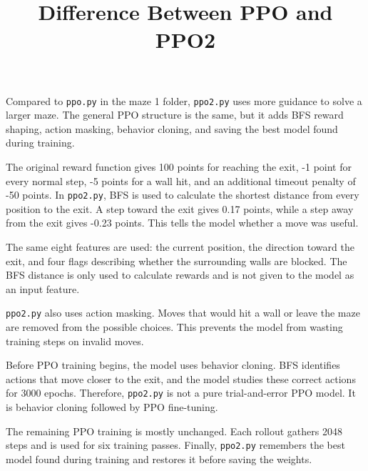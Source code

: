 \documentclass[11pt]{article}
\title{Difference Between PPO and PPO2}
\author{}
\date{}
\begin{document}
\maketitle

Compared to \texttt{ppo.py} in the maze 1 folder, \texttt{ppo2.py} uses more
guidance to solve a larger maze. The general PPO structure is the same, but it
adds BFS reward shaping, action masking, behavior cloning, and saving the best
model found during training.

The original reward function gives 100 points for reaching the exit, -1 point
for every normal step, -5 points for a wall hit, and an additional timeout
penalty of -50 points. In \texttt{ppo2.py}, BFS is used to calculate the
shortest distance from every position to the exit. A step toward the exit gives
0.17 points, while a step away from the exit gives -0.23 points. This tells the
model whether a move was useful.

The same eight features are used: the current position, the direction toward
the exit, and four flags describing whether the surrounding walls are blocked.
The BFS distance is only used to calculate rewards and is not given to the
model as an input feature.

\texttt{ppo2.py} also uses action masking. Moves that would hit a wall or leave
the maze are removed from the possible choices. This prevents the model from
wasting training steps on invalid moves.

Before PPO training begins, the model uses behavior cloning. BFS identifies
actions that move closer to the exit, and the model studies these correct
actions for 3000 epochs. Therefore, \texttt{ppo2.py} is not a pure
trial-and-error PPO model. It is behavior cloning followed by PPO fine-tuning.

The remaining PPO training is mostly unchanged. Each rollout gathers 2048
steps and is used for six training passes. Finally, \texttt{ppo2.py} remembers
the best model found during training and restores it before saving the weights.
\end{document}
